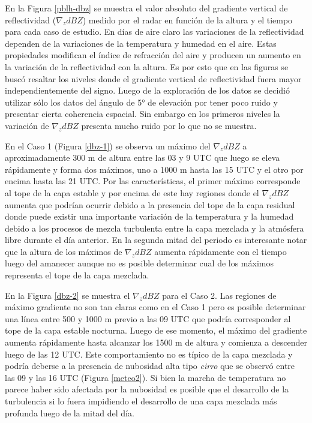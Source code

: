\documentclass[12pt,spanish,oneside]{book}
\begin{document}
En la Figura \ref{pblh-dbz} se muestra el valor absoluto del gradiente
vertical de reflectividad (\(\nabla_z dBZ\)) medido por el radar en
función de la altura y el tiempo para cada caso de estudio. En días de
aire claro las variaciones de la reflectividad dependen de la
variaciones de la temperatura y humedad en el aire. Estas propiedades
modifican el índice de refracción del aire y producen un aumento en la
variación de la reflectividad con la altura. Es por esto que en las
figuras se buscó resaltar los niveles donde el gradiente vertical de
reflectividad fuera mayor independientemente del signo. Luego de la
exploración de los datos se decidió utilizar sólo los datos del ángulo
de 5° de elevación por tener poco ruido y presentar cierta coherencia
espacial. Sin embargo en los primeros niveles la variación de
\(\nabla_z dBZ\) presenta mucho ruido por lo que no se muestra.

En el Caso 1 (Figura \ref{dbz-1}) se observa un máximo del
\(\nabla_z dBZ\) a aproximadamente 300 m de altura entre las 03 y 9 UTC
que luego se eleva rápidamente y forma dos máximos, uno a 1000 m hasta
las 15 UTC y el otro por encima hasta las 21 UTC. Por las
características, el primer máximo corresponde al tope de la capa estable
y por encima de este hay regiones donde el \(\nabla_z dBZ\) aumenta que
podrían ocurrir debido a la presencia del tope de la capa residual donde
puede existir una importante variación de la temperatura y la humedad
debido a los procesos de mezcla turbulenta entre la capa mezclada y la
atmósfera libre durante el día anterior. En la segunda mitad del periodo
es interesante notar que la altura de los máximos de \(\nabla_z dBZ\)
aumenta rápidamente con el tiempo luego del amanecer aunque no es
posible determinar cual de los máximos representa el tope de la capa
mezclada.

En la Figura \ref{dbz-2} se muestra el \(\nabla_z dBZ\) para el Caso 2.
Las regiones de máximo gradiente no son tan claras como en el Caso 1
pero es posible determinar una línea entre 500 y 1000 m previo a las 09
UTC que podría corresponder al tope de la capa estable nocturna. Luego
de ese momento, el máximo del gradiente aumenta rápidamente hasta
alcanzar los 1500 m de altura y comienza a descender luego de las 12
UTC. Este comportamiento no es típico de la capa mezclada y podría
deberse a la presencia de nubosidad alta tipo \emph{cirro} que se
observó entre las 09 y las 16 UTC (Figura \ref{meteo2}). Si bien la
marcha de temperatura no parece haber sido afectada por la nubosidad es
posible que el desarrollo de la turbulencia si lo fuera impidiendo el
desarrollo de una capa mezclada más profunda luego de la mitad del día.
\end{document}
